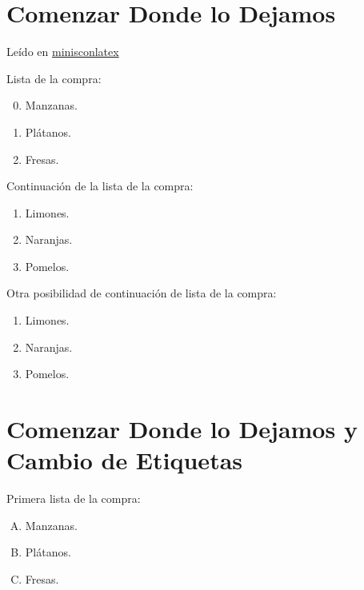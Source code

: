 \documentclass[12pt,
              ]{article}
\begin{document}
\section{Comenzar Donde lo Dejamos}


Leído en \href{https://goo.gl/txW3PR}{minisconlatex}


Lista de la compra:
\begin{enumerate}
  \setcounter{enumi}{-1}
\item Manzanas.
\item Plátanos.
\item Fresas.
  \setcounter{nx}{\value{enumi}} %
\end{enumerate}

Continuación de la lista de la compra:

\begin{enumerate}
  \setcounter{enumi}{\value{nx}} %
\item Limones.
\item Naranjas.
\item Pomelos.
\end{enumerate}

Otra posibilidad de continuación de lista de la compra:

\begin{enumerate}[{2.}i]
  \setcounter{enumi}{\value{nx}} %
\item Limones.
\item Naranjas.
\item Pomelos.
\end{enumerate}

\section{Comenzar Donde lo Dejamos y Cambio de Etiquetas}


Primera lista de la compra:

\begin{enumerate}[(A)]
\item Manzanas.
\item Plátanos.
\item Fresas.
\setcounter{mx}{\value{enumi}} %
\end{enumerate}
\end{document}
